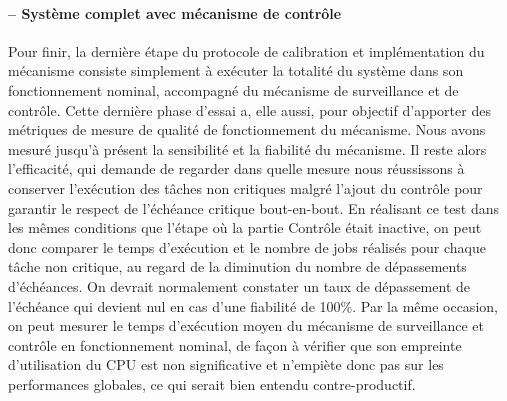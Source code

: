 \documentclass[french, a4paper, 11pt, twoside, pdftex]{StyleThese}
\begin{document}
		\paragraph{ -- Système complet avec mécanisme de contrôle}
		 Pour finir, la dernière étape du protocole de calibration et implémentation du mécanisme consiste simplement à exécuter la totalité du système dans son fonctionnement nominal, accompagné du mécanisme de surveillance et de contrôle. 
		 Cette dernière phase d'essai a, elle aussi, pour objectif d'apporter des métriques de mesure de qualité de fonctionnement du mécanisme. Nous avons mesuré jusqu'à présent la sensibilité et la fiabilité du mécanisme. Il reste alors l'efficacité, qui demande de regarder dans quelle mesure nous réussissons à conserver l'exécution des tâches non critiques malgré l'ajout du contrôle pour garantir le respect de l'échéance critique bout-en-bout.
		 En réalisant ce test dans les mêmes conditions que l'étape  où la partie Contrôle était inactive, on peut donc comparer le temps d'exécution et le nombre de jobs réalisés pour chaque tâche non critique, au regard de la diminution du nombre de dépassements d'échéances. On devrait normalement constater un taux de dépassement de l'échéance qui devient nul en cas d'une fiabilité de 100\%.
		 Par la même occasion, on peut mesurer le temps d'exécution moyen du mécanisme de surveillance et contrôle en fonctionnement nominal, de façon à vérifier que son empreinte d'utilisation du CPU est non significative et n'empiète donc pas sur les performances globales, ce qui serait bien entendu contre-productif.
		 
\end{document}
